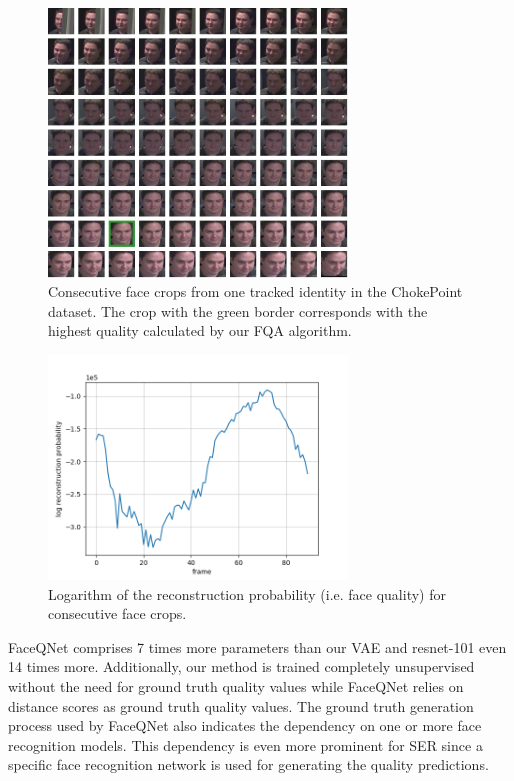 \documentclass[letterpaper]{article} %
\begin{document}
\begin{figure}[h!]
\centering
\includegraphics[width=225pt]{figures/cp_map_0.jpg}
\caption{Consecutive face crops from one tracked identity in the ChokePoint dataset. The crop with the green border corresponds with the highest quality calculated by our FQA algorithm.}
\label{fig:cp_map_0}
\end{figure}
\begin{figure}[h!]
\centering
\includegraphics[width=225pt]{figures/cp_plot_0.png}
\caption{Logarithm of the reconstruction probability (i.e. face quality) for consecutive face crops.}
\label{fig:cp_plot_0}
\end{figure}
FaceQNet comprises 7 times more parameters than our VAE and resnet-101 even 14 times more. Additionally, our method is trained completely unsupervised without the need for ground truth quality values while FaceQNet relies on distance scores as ground truth quality values. The ground truth generation process used by FaceQNet also indicates the dependency on one or more face recognition models. This dependency is even more prominent for SER since a specific face recognition network is used for generating the quality predictions.
\end{document}
